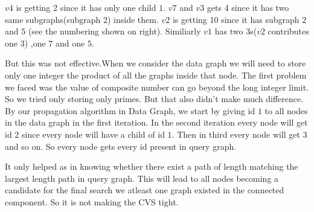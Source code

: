 \hspace{10mm}  $v4$ is getting 2 since it has only one child $1$. $v7$ and $v3$ gets 4 since it has two same subgraphs(subgraph $2$) inside them. $v2$ is getting 10 since it has subgraph $2$ and $5$ (see the numbering shown on right). Similiarly $v1$ has two $3$s($v2$ contributes one $3$) ,one $7$ and one $5$.

 \hspace{10mm}	But this was not effective.When we consider the data graph we will need to store only one integer the product of all the graphs inside that node. The first problem we faced was the value of composite number can go beyond the long integer limit. So we tried only storing only primes. But that also didn't make much difference. By our propagation algorithm in Data Graph, we start by giving id $1$ to all nodes in the data graph in the first iteration. In the second iteration every node will get id $2$ since every node will have a child of id $1$. Then in third every node will get $3$ and so on. So every node gets every id present in query graph.
 
 \hspace{10mm} It only helped as in knowing whether there exist a path of length matching the largest length path in query graph. This will lead to all nodes becoming a candidate for the final search we atleast one graph existed in the connected component. So it is not making the CVS tight.
	